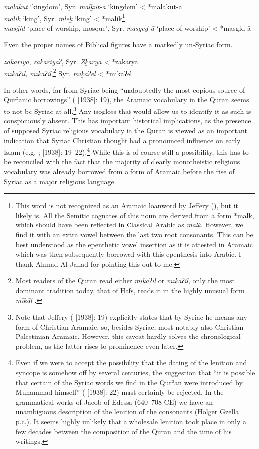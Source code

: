 \documentclass[output=paper]{langsci/langscibook}
\begin{document}
\ea
\ea\textit{malakūt} ‘kingdom’, Syr. \textit{malḵūṯ-ā} ‘kingdom’ < *malakūt-ā\\
\ex\textit{malik} ‘king’, Syr. \textit{mleḵ} ‘king’ < *malik\footnote{This word is not recognized as an Aramaic loanword by Jeffery (\citeyear[270]{Jeffrey2007}), but it likely is. All the Semitic cognates of this noun are derived from a form *malk, which should have been reflected in Classical Arabic as \textit{malk}. However, we find it with an extra vowel between the last two root consonants. This can be best understood as the epenthetic vowel insertion as it is attested in Aramaic which was then subsequently borrowed with this epenthesis into Arabic. I thank Ahmad Al-Jallad for pointing this out to me.}\\
\ex\textit{masǧid} ‘place of worship, mosque’, Syr. \textit{masgeḏ-ā} ‘place of worship’ < *masgid-ā
\z
\z

\noindent Even the proper names of Biblical figures have a markedly un-Syriac form.

\ea
\ea\textit{zakariyā}, \textit{zakariyāʔ}, Syr. \textit{Zḵaryā} \textit{<} *zakaryā\\
\ex\textit{mīkāʔīl,} \textit{mīkāʔil},\footnote{Most readers of the Quran read either \textit{mīkāʔīl} or \textit{mīkāʔil}, only the most dominant tradition today, that of Ḥafṣ, reads it in the highly unusual form \textit{mīkāl} \citep[166]{IbnMujahid}.} Syr. \textit{mīḵāʔel} < *mīkāʔēl
\z
\z

In other words, far from Syriac being “undoubtedly the most copious source of Qurʾānic borrowings” (\citealt{Jeffrey2007} [1938]: 19), the Aramaic vocabulary in the Quran seems to not be Syriac at all.\footnote{Note that Jeffery (\citeyear{Jeffrey2007} [1938]: 19) explicitly states that by Syriac he means any form of Christian Aramaic, so, besides Syriac, most notably also Christian Palestinian Aramaic. However, this caveat hardly solves the chronological problem, as the latter rises to prominence even later.} Any isogloss that would allow us to identify it as such is conspicuously absent. This has important historical implications, as the presence of supposed Syriac religious vocabulary in the Quran is viewed as an important indication that Syriac Christian thought had a pronounced influence on early Islam (e.g. \citealt[82--90]{Mingana1927}; \citealt{Jeffrey2007} [1938]: 19--22).\footnote{Even if we were to accept the possibility that the dating of the lenition and syncope is somehow off by several centuries, the suggestion that “it is possible that certain of the Syriac words we find in the Qurʾān were introduced by Muḥammad himself” (\citealt{Jeffrey2007} [1938]: 22) must certainly be rejected. In the grammatical works of Jacob of Edessa (640–708 CE) we have an unambiguous description of the lenition of the consonants (Holger Gzella p.c.). It seems highly unlikely that a wholesale lenition took place in only a few decades between the composition of the Quran and the time of his writings.} While this is of course still a possibility, this has to be reconciled with the fact that the majority of clearly monotheistic religious vocabulary was already borrowed from a form of Aramaic before the rise of Syriac as a major religious language.
\end{document}
